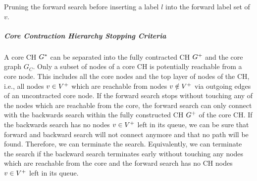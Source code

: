 \begin{algorithm}[hbtp]
	\DontPrintSemicolon



	\caption{\label{alg:bw_pruning} Pruning the forward search before inserting a label $l$ into the forward label set of $v$.}
\end{algorithm}


\subparagraph{Core Contraction Hierarchy Stopping Criteria}
A core CH $G^*$ can be separated into the fully contracted CH $G^+$ and the core graph $G_C$. Only a subset of nodes of a core CH is potentially reachable from a core node. This includes all the core nodes and the top layer of nodes of the CH, i.e., all nodes $v \in V^+$ which are reachable from nodes $v \notin V^+$ via outgoing edges of an uncontracted core node. If the forward search stops without touching any of the nodes which are reachable from the core, the forward search can only connect with the backwards search within the fully constructed CH $G^+$ of the core CH. If the backwards search has no nodes $v \in V^+$ left in its queue, we can be sure that forward and backward search will not connect anymore and that no path will be found. Therefore, we can terminate the search. Equivalently, we can terminate the search if the backward search terminates early without touching any nodes which are reachable from the core and the forward search has no CH nodes $v \in V^+$ left in its queue.


